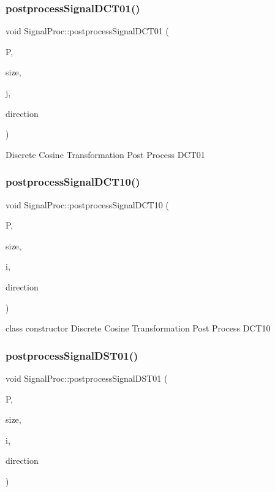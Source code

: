 \subsubsection{\texorpdfstring{postprocess\+Signal\+D\+C\+T01()}{postprocessSignalDCT01()}}
{\footnotesize\ttfamily void Signal\+Proc\+::postprocess\+Signal\+D\+C\+T01 (\begin{DoxyParamCaption}\item[{\mbox{\hyperlink{classChunkedArray}{Chunked\+Array}} \&}]{P,  }\item[{const int}]{size,  }\item[{const int}]{j,  }\item[{const int}]{direction }\end{DoxyParamCaption})}

Discrete Cosine Transformation Post Process D\+C\+T01 \mbox{\label{classSignalProc_a5f3eedc058066d233a1fc8f9d7bc4ea4}} 
\subsubsection{\texorpdfstring{postprocess\+Signal\+D\+C\+T10()}{postprocessSignalDCT10()}}
{\footnotesize\ttfamily void Signal\+Proc\+::postprocess\+Signal\+D\+C\+T10 (\begin{DoxyParamCaption}\item[{\mbox{\hyperlink{classChunkedArray}{Chunked\+Array}} \&}]{P,  }\item[{const int}]{size,  }\item[{const int}]{i,  }\item[{const int}]{direction }\end{DoxyParamCaption})}

class constructor Discrete Cosine Transformation Post Process D\+C\+T10 \mbox{\label{classSignalProc_a686e7c9a474f519a204782145e6a2c8e}} 
\subsubsection{\texorpdfstring{postprocess\+Signal\+D\+S\+T01()}{postprocessSignalDST01()}}
{\footnotesize\ttfamily void Signal\+Proc\+::postprocess\+Signal\+D\+S\+T01 (\begin{DoxyParamCaption}\item[{\mbox{\hyperlink{classChunkedArray}{Chunked\+Array}} \&}]{P,  }\item[{const int}]{size,  }\item[{const int}]{i,  }\item[{const int}]{direction }\end{DoxyParamCaption})}

